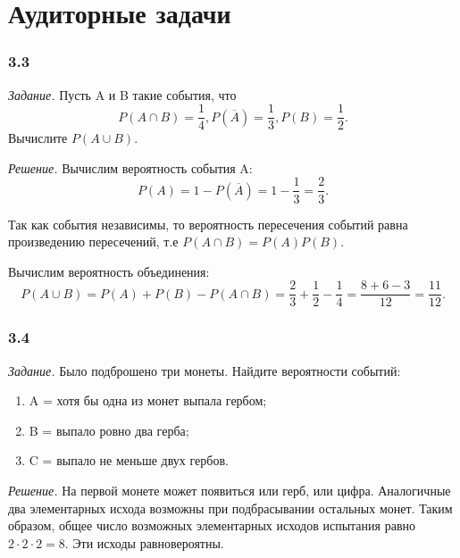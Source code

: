 \section*{Аудиторные задачи}

\subsubsection*{3.3}

\textit{Задание.} Пусть A и B такие события, что
$$P \left( A \cap B \right) = \frac{1}{4},
P \left( \overline{A} \right) = \frac{1}{3},
P \left( B \right) = \frac{1}{2}. $$
Вычислите $P \left( A \cup B \right)$.

\textit{Решение.} Вычислим вероятность события A:
$$P \left( A \right) =
1 - P \left( \overline{A} \right) =
1 - \frac{1}{3} =
\frac{2}{3}.$$

Так как события независимы, то вероятность пересечения событий равна произведению пересечений, т.е
$P \left( A \cap B \right) = P \left( A \right) P \left( B \right) $.

Вычислим вероятность объединения:
$$P \left( A \cup B \right) =
P \left( A \right) + P \left( B \right) - P \left( A \cap B \right) =
\frac{2}{3} + \frac{1}{2} - \frac{1}{4} =
\frac{8+6-3}{12} =
\frac{11}{12}.$$

\subsubsection*{3.4}

\textit{Задание.} Было подброшено три монеты.
Найдите вероятности событий:
\begin{enumerate}[label=\alph*)]
\item A = {хотя бы одна из монет выпала гербом};
\item B = {выпало ровно два герба};
\item C = {выпало не меньше двух гербов}.
\end{enumerate}

\textit{Решение.} На первой монете может появиться или герб, или цифра.
Аналогичные два элементарных исхода возможны при подбрасывании остальных монет.
Таким образом, общее число возможных элементарных исходов испытания равно $2 \cdot 2 \cdot 2 = 8$.
Эти исходы равновероятны.

